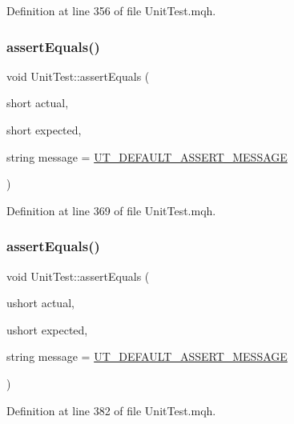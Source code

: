 Definition at line 356 of file Unit\+Test.\+mqh.

\mbox{\label{class_unit_test_a005a358493b8c45e8aca3e771fcec9c6}} 
\subsubsection{\texorpdfstring{assert\+Equals()}{assertEquals()}\hspace{0.1cm}{\footnotesize\ttfamily [4/28]}}
{\footnotesize\ttfamily void Unit\+Test\+::assert\+Equals (\begin{DoxyParamCaption}\item[{short}]{actual,  }\item[{short}]{expected,  }\item[{string}]{message = {\ttfamily \mbox{\hyperlink{_unit_test_8mqh_a96f5d62188d09039ebc3f443c9120e39}{U\+T\+\_\+\+D\+E\+F\+A\+U\+L\+T\+\_\+\+A\+S\+S\+E\+R\+T\+\_\+\+M\+E\+S\+S\+A\+GE}}} }\end{DoxyParamCaption})}



Definition at line 369 of file Unit\+Test.\+mqh.

\mbox{\label{class_unit_test_aaca7c2c1c646396c291b9d0b66ac6547}} 
\subsubsection{\texorpdfstring{assert\+Equals()}{assertEquals()}\hspace{0.1cm}{\footnotesize\ttfamily [5/28]}}
{\footnotesize\ttfamily void Unit\+Test\+::assert\+Equals (\begin{DoxyParamCaption}\item[{ushort}]{actual,  }\item[{ushort}]{expected,  }\item[{string}]{message = {\ttfamily \mbox{\hyperlink{_unit_test_8mqh_a96f5d62188d09039ebc3f443c9120e39}{U\+T\+\_\+\+D\+E\+F\+A\+U\+L\+T\+\_\+\+A\+S\+S\+E\+R\+T\+\_\+\+M\+E\+S\+S\+A\+GE}}} }\end{DoxyParamCaption})}



Definition at line 382 of file Unit\+Test.\+mqh.

